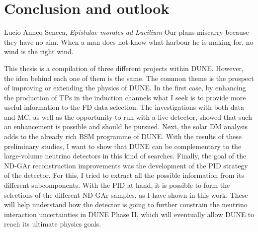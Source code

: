 \chapter{Conclusion and outlook}
\label{chapter:conclusion}

\begin{chapquote}{Lucio Anneo Seneca, \textit{Epistulae morales ad Lucilium}}
    Our plans miscarry because they have no aim. When a man does not know what harbour he is making for, no wind is the right wind.
\end{chapquote}

This thesis is a compilation of three different projects within DUNE. However, the idea behind each one of them is the same. The common theme is the prospect of improving or extending the physics of DUNE. In the first case, by enhancing the production of TPs in the induction channels what I seek is to provide more useful information to the FD data selection. The investigations with both data and MC, as well as the opportunity to run with a live detector, showed that such an enhancement is possible and should be pursued. Next, the solar DM analysis adds to the already rich BSM programme of DUNE. With the results of these preliminary studies, I want to show that DUNE can be complementary to the large-volume neutrino detectors in this kind of searches. Finally, the goal of the ND-GAr reconstruction improvements was the development of the PID strategy of the detector. For this, I tried to extract all the possible information from its different subcomponents. With the PID at hand, it is possible to form the selections of the different ND-GAr samples, as I have shown in this work. These will help understand how the detector is going to further constrain the neutrino interaction uncertainties in DUNE Phase II, which will eventually allow DUNE to reach its ultimate physics goals.







